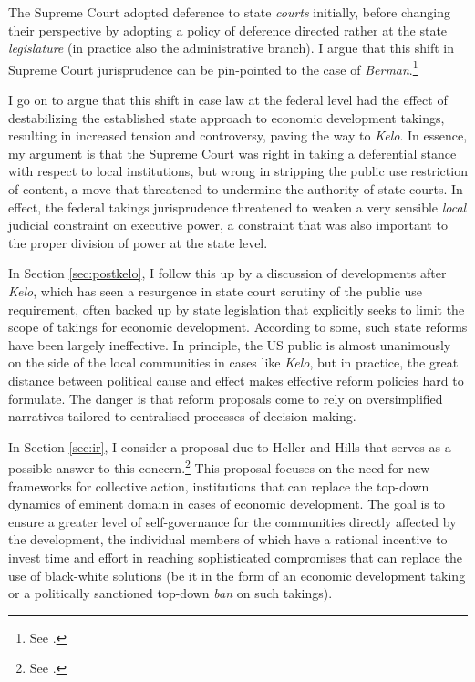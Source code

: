 The Supreme Court adopted deference to state {\it courts} initially, before changing their perspective by adopting a policy of deference directed rather at the state {\it legislature} (in practice also the administrative branch). I argue that this shift in Supreme Court jurisprudence can be pin-pointed to the case of {\it Berman}.\footnote{See \cite{berman54}.}

I go on to argue that this shift in case law at the federal level had the effect of destabilizing the established state approach to economic development takings, resulting in increased tension and controversy, paving the way to {\it Kelo}. In essence, my argument is that the Supreme Court was right in taking a deferential stance with respect to local institutions, but wrong in stripping the public use restriction of content, a move that threatened to undermine the authority of state courts. In effect, the federal takings jurisprudence threatened to weaken a very sensible {\it local} judicial constraint on executive power, a constraint that was also important to the proper division of power at the state level.

In Section \ref{sec:postkelo}, I follow this up by a discussion of developments after {\it Kelo}, which has seen a resurgence in state court scrutiny of the public use requirement, often backed up by state legislation that explicitly seeks to limit the scope of takings for economic development. According to some, such state reforms have been largely ineffective. %
In principle, the US public is almost unanimously on the side of the local communities in cases like {\it Kelo}, but in practice, the great distance between political cause and effect makes effective reform policies hard to formulate. The danger is that reform proposals come to rely on oversimplified narratives tailored to centralised processes of decision-making.

In Section \ref{sec:ir}, I consider a proposal due to Heller and Hills that serves as a possible answer to this concern.\footnote{See \cite{heller08}.} This proposal focuses on the need for new frameworks for collective action, institutions that can replace the top-down dynamics of eminent domain in cases of economic development. The goal is to ensure a greater level of self-governance for the communities directly affected by the development, the individual members of which have a rational incentive to invest time and effort in reaching sophisticated compromises that can replace the use of black-white solutions (be it in the form of an economic development taking or a politically sanctioned top-down {\it ban} on such takings).

